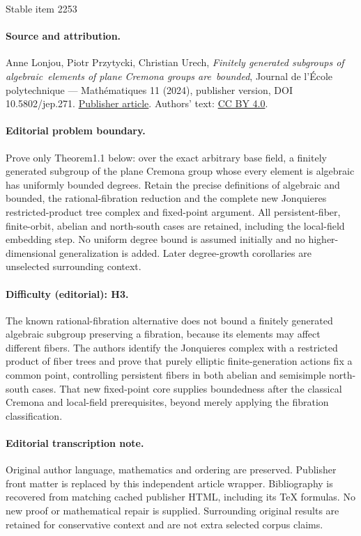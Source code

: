 \documentclass[11pt]{article}
\numberwithin{equation}{section}
\theoremstyle{plain}
\theoremstyle{definition}
\begin{document}
\begin{center}{\Large Stable item 2253}\end{center}
\paragraph{Source and attribution.}
Anne Lonjou, Piotr Przytycki, Christian Urech, \emph{Finitely generated subgroups of algebraic elements of plane Cremona groups are bounded}, Journal de l’École polytechnique — Mathématiques 11 (2024), publisher version, DOI 10.5802/jep.271. \href{https://jep.centre-mersenne.org/articles/10.5802/jep.271/}{Publisher article}. Authors' text: \href{https://creativecommons.org/licenses/by/4.0/}{CC BY 4.0}.
\paragraph{Editorial problem boundary.}
Prove only Theorem1.1 below: over the exact arbitrary base field, a finitely generated subgroup of the plane Cremona group whose every element is algebraic has uniformly bounded degrees. Retain the precise definitions of algebraic and bounded, the rational-fibration reduction and the complete new Jonquieres restricted-product tree complex and fixed-point argument. All persistent-fiber, finite-orbit, abelian and north-south cases are retained, including the local-field embedding step. No uniform degree bound is assumed initially and no higher-dimensional generalization is added. Later degree-growth corollaries are unselected surrounding context.
\paragraph{Difficulty (editorial): H3.}
The known rational-fibration alternative does not bound a finitely generated algebraic subgroup preserving a fibration, because its elements may affect different fibers. The authors identify the Jonquieres complex with a restricted product of fiber trees and prove that purely elliptic finite-generation actions fix a common point, controlling persistent fibers in both abelian and semisimple north-south cases. That new fixed-point core supplies boundedness after the classical Cremona and local-field prerequisites, beyond merely applying the fibration classification.
\paragraph{Editorial transcription note.}
Original author language, mathematics and ordering are preserved. Publisher front matter is replaced by this independent article wrapper. Bibliography is recovered from matching cached publisher HTML, including its TeX formulas. No new proof or mathematical repair is supplied. Surrounding original results are retained for conservative context and are not extra selected corpus claims.
\clearpage
\end{document}
